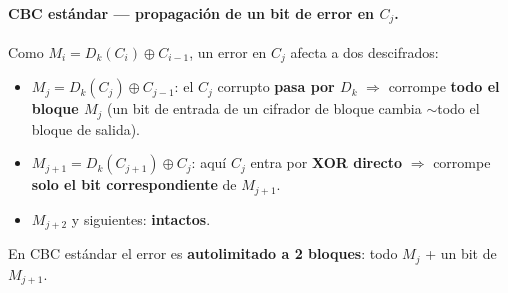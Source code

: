 \documentclass[../main.tex]{subfiles}
\begin{document}
\paragraph{CBC estándar — propagación de un bit de error en $C_j$.}
Como $M_i = D_k(C_i)\oplus C_{i-1}$, un error en $C_j$ afecta a dos
descifrados:
\begin{itemize}[nosep]
  \item $M_j = D_k(C_j)\oplus C_{j-1}$: el $C_j$ corrupto \textbf{pasa por
        $D_k$} $\Rightarrow$ corrompe \textbf{todo el bloque $M_j$} (un bit de
        entrada de un cifrador de bloque cambia $\sim$todo el bloque de salida).
  \item $M_{j+1} = D_k(C_{j+1})\oplus C_j$: aquí $C_j$ entra por \textbf{XOR
        directo} $\Rightarrow$ corrompe \textbf{solo el bit correspondiente} de
        $M_{j+1}$.
  \item $M_{j+2}$ y siguientes: \textbf{intactos}.
\end{itemize}
\begin{destacado}
En CBC estándar el error es \textbf{autolimitado a 2 bloques}: todo $M_j$ + un
bit de $M_{j+1}$.
\end{destacado}
\end{document}
